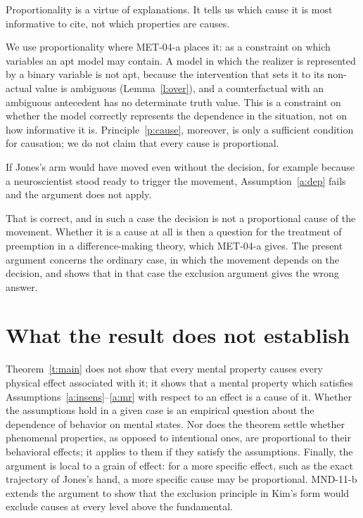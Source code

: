 \documentclass{situationist-preprint}
\begin{document}
\begin{objection}
Proportionality is a virtue of explanations. It tells us which cause it is most informative to cite, not which properties are causes.
\end{objection}

\begin{reply}
We use proportionality where MET-04-a places it: as a constraint on which variables an apt model may contain. A model in which the realizer is represented by a binary variable is not apt, because the intervention that sets it to its non-actual value is ambiguous (Lemma~\ref{l:over}), and a counterfactual with an ambiguous antecedent has no determinate truth value. This is a constraint on whether the model correctly represents the dependence in the situation, not on how informative it is. Principle~\ref{p:cause}, moreover, is only a sufficient condition for causation; we do not claim that every cause is proportional.
\end{reply}

\begin{objection}
If Jones's arm would have moved even without the decision, for example because a neuroscientist stood ready to trigger the movement, Assumption~\ref{a:dep} fails and the argument does not apply.
\end{objection}

\begin{reply}
That is correct, and in such a case the decision is not a proportional cause of the movement. Whether it is a cause at all is then a question for the treatment of preemption in a difference-making theory, which MET-04-a gives. The present argument concerns the ordinary case, in which the movement depends on the decision, and shows that in that case the exclusion argument gives the wrong answer.
\end{reply}

\section{What the result does not establish}

Theorem~\ref{t:main} does not show that every mental property causes every physical effect associated with it; it shows that a mental property which satisfies Assumptions~\ref{a:insens}--\ref{a:mr} with respect to an effect is a cause of it. Whether the assumptions hold in a given case is an empirical question about the dependence of behavior on mental states. Nor does the theorem settle whether phenomenal properties, as opposed to intentional ones, are proportional to their behavioral effects; it applies to them if they satisfy the assumptions. Finally, the argument is local to a grain of effect: for a more specific effect, such as the exact trajectory of Jones's hand, a more specific cause may be proportional. MND-11-b extends the argument to show that the exclusion principle in Kim's form would exclude causes at every level above the fundamental.
\end{document}
